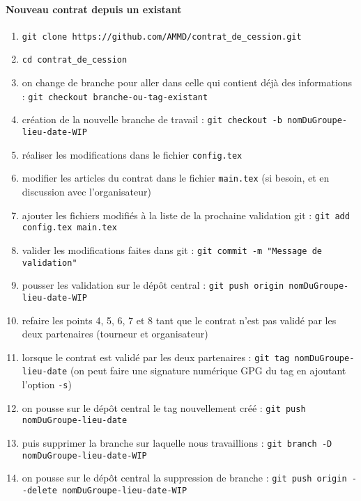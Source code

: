 \documentclass[a4paper]{article}
\begin{document}
\paragraph{Nouveau contrat depuis un existant}
\label{sec:NouveauContratCessionDepuisExistant}
\begin{enumerate}
    \item \lstinline{git clone https://github.com/AMMD/contrat_de_cession.git}
    \item \lstinline{cd contrat_de_cession}
    \item on change de branche pour aller dans celle qui contient déjà
    des informations : \lstinline{git checkout branche-ou-tag-existant}
    \item création de la nouvelle branche de travail :
    \lstinline{git checkout -b nomDuGroupe-lieu-date-WIP}
    \item réaliser les modifications dans le fichier
    \lstinline{config.tex}
    \item modifier les articles du contrat dans le fichier
    \lstinline{main.tex} (si besoin, et en discussion avec
    l'organisateur)
    \item ajouter les fichiers modifiés à la liste de la prochaine
    validation git : \lstinline{git add config.tex main.tex}
    \item valider les modifications faites dans git :
    \lstinline{git commit -m "Message de validation"}
    \item pousser les validation sur le dépôt central :
    \lstinline{git push origin nomDuGroupe-lieu-date-WIP}
    \item refaire les points 4, 5, 6, 7 et 8 tant que le contrat n'est
    pas validé par les deux partenaires (tourneur et organisateur)
    \item lorsque le contrat est validé par les deux partenaires :
    \lstinline{git tag nomDuGroupe-lieu-date} (on peut faire
      une signature numérique GPG du tag en ajoutant l'option
      \lstinline{-s})
    \item on pousse sur le dépôt central le tag nouvellement créé :
    \lstinline{git push nomDuGroupe-lieu-date}
    \item puis supprimer la branche sur laquelle nous travaillions :
    \lstinline{git branch -D nomDuGroupe-lieu-date-WIP}
    \item on pousse sur le dépôt central la suppression de branche :
    \lstinline{git push origin --delete nomDuGroupe-lieu-date-WIP}
\end{enumerate}
\end{document}

